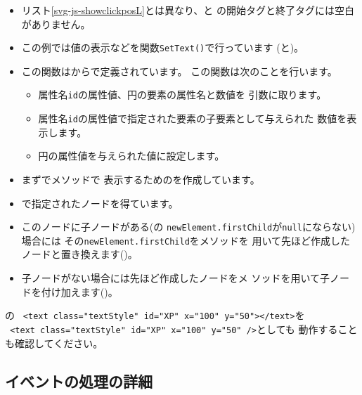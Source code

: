 \begin{itemize}
 \item リスト\ref{svg-js-showclickposL}とは異なり、と
       の開始タグと終了タグには空白がありません。
 \item この例では値の表示などを関数\texttt{SetText()}で行っています
       (と)。
  \item この関数はからで定義されています。
この関数は次のことを行います。
\begin{itemize}
 \item 属性名\texttt{id}の属性値、円の要素の属性名と数値を
       引数に取ります。
 \item 属性名\texttt{id}の属性値で指定された要素の子要素として与えられた
       数値を表示します。
 \item 円の属性値を与えられた値に設定します。
\end{itemize}
 \item まずでメソッドで
       表示するためのを作成しています。
 \item {}で指定されたノードを得ています。
 \item このノードに子ノードがある(の
       \texttt{newElement.firstChild}が\texttt{null}にならない)場合には
       その\texttt{newElement.firstChild}をメソッドを
       用いて先ほど作成したノードと置き換えます()。
 \item 子ノードがない場合には先ほど作成したノードをメ
       ソッドを用いて子ノードを付け加えます()。
\end{itemize}
の
\texttt{  <text class="textStyle" id="XP" x="100" y="50"></text>}を\\
\texttt{  <text class="textStyle" id="XP" x="100" y="50" />}としても
動作することも確認してください。

\subsection{イベントの処理の詳細}\label{eventbubling}
